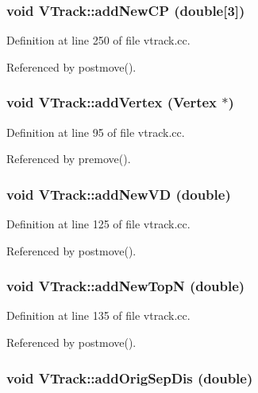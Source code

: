 \subsubsection{\setlength{\rightskip}{0pt plus 5cm}void VTrack::add\-New\-CP (double[3])}\label{classVTrack_f94c5aa8a9c0fdaef8e8307f52467488}




Definition at line 250 of file vtrack.cc.

Referenced by postmove().
\subsubsection{\setlength{\rightskip}{0pt plus 5cm}void VTrack::add\-Vertex ({\bf Vertex} $\ast$)}\label{classVTrack_92f6a3668ad24dce5ae5fa49c39b9196}




Definition at line 95 of file vtrack.cc.

Referenced by premove().
\subsubsection{\setlength{\rightskip}{0pt plus 5cm}void VTrack::add\-New\-VD (double)}\label{classVTrack_149d5c6161c842d3f3e36df7e4cc8efc}




Definition at line 125 of file vtrack.cc.

Referenced by postmove().
\subsubsection{\setlength{\rightskip}{0pt plus 5cm}void VTrack::add\-New\-Top\-N (double)}\label{classVTrack_af74c77dff5cdd41febb3cb1f4b3e383}




Definition at line 135 of file vtrack.cc.

Referenced by postmove().
\subsubsection{\setlength{\rightskip}{0pt plus 5cm}void VTrack::add\-Orig\-Sep\-Dis (double)}\label{classVTrack_c2bb39280976c84ea65cb890bc41ed69}




